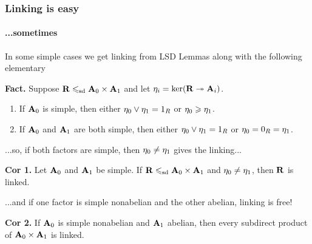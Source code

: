 \documentclass[9pt,xcolor=dvipsnames%
   ]{beamer}
\renewcommand{\alert}[1]{\textcolor{olivegreen}{#1}}
\renewcommand{\emph}[1]{\alert{{\it #1}}}
\begin{document}
\begin{frame} \frametitle{Linking is easy}
  \framesubtitle{...sometimes}
  In some simple cases we get linking from LSD Lemmas along with 
  the following elementary

  \bigskip
  
  {\bf Fact.}  Suppose $\mathbf{R} \leqslant_{\mathrm{sd}} \mathbf{A}_0 \times \mathbf{A}_1$ and let $\eta_i = \ker(\mathbf{R} \twoheadrightarrow \mathbf{A}_i)$.
    \begin{enumerate}
    \item 
      If $\mathbf{A}_0$ is simple, then either $\eta_0 \vee \eta_1 = 1_R$ or $\eta_0 \geqslant \eta_1$.
    \item If $\mathbf{A}_0$ and $\mathbf{A}_1$ are both simple, then either $\eta_0 \vee \eta_1 = 1_R$
      or $\eta_0 = 0_R = \eta_1$.
    \end{enumerate}
  
  \bigskip
  ...so, if both factors are simple, then $\eta_0 \neq \eta_1$ gives the linking...

  \bigskip
{\bf Cor 1.}    Let $\mathbf{A}_0$ and $\mathbf{A}_1$ be simple. If  $\mathbf{R} \leqslant_{\mathrm{sd}} \mathbf{A}_0\times \mathbf{A}_1$
and $\eta_0 \neq \eta_1$, then $\mathbf{R}$ is linked.

  \bigskip

...and if one factor is simple nonabelian and the other abelian, linking is free! 

  \bigskip
{\bf Cor 2.}  If $\mathbf{A}_0$ is simple nonabelian and $\mathbf{A}_1$ abelian, then
    every subdirect product of $\mathbf{A}_0 \times \mathbf{A}_1$ is linked.


\end{frame}

\end{document}
